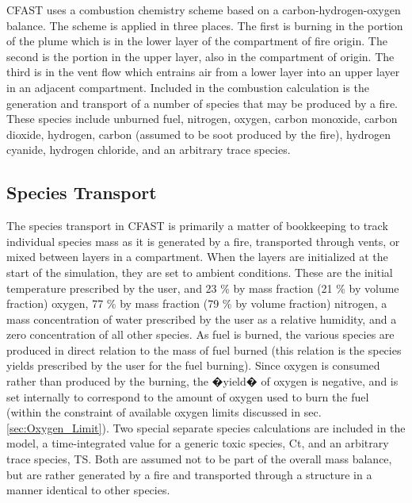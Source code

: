 CFAST uses a combustion chemistry scheme based on a carbon-hydrogen-oxygen balance.  The scheme is applied in three places.  The first is burning in the portion of the plume which is in the lower layer of the compartment of fire origin.  The second is the portion in the upper layer, also in the compartment of origin.  The third is in the vent flow which entrains air from a lower layer into an upper layer in an adjacent compartment.  Included in the combustion calculation is the generation and transport of a number of species that may be produced by a fire.  These species include unburned fuel, nitrogen, oxygen, carbon monoxide, carbon dioxide, hydrogen, carbon (assumed to be soot produced by the fire), hydrogen cyanide, hydrogen chloride, and an arbitrary trace species.

\subsection{Species Transport}

The species transport in CFAST is primarily a matter of bookkeeping to track individual species mass as it is generated by a fire, transported through vents, or mixed between layers in a compartment.  When the layers are initialized at the start of the simulation, they are set to ambient conditions.  These are the initial temperature prescribed by the user, and 23 \% by mass fraction (21 \% by volume fraction) oxygen, 77 \% by mass fraction (79 \% by volume fraction) nitrogen, a mass concentration of water prescribed by the user as a relative humidity, and a zero concentration of all other species.  As fuel is burned, the various species are produced in direct relation to the mass of fuel burned (this relation is the species yields prescribed by the user for the fuel burning).  Since oxygen is consumed rather than produced by the burning, the �yield� of oxygen is negative, and is set internally to correspond to the amount of oxygen used to burn the fuel (within the constraint of available oxygen limits discussed in sec. \ref{sec:Oxygen_Limit}). Two special separate species calculations are included in the model, a time-integrated value for a generic toxic species, Ct, and an arbitrary trace species, TS.  Both are assumed not to be part of the overall mass balance, but are rather generated by a fire and transported through a structure in a manner identical to other species.


